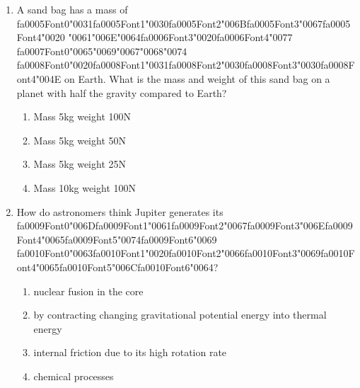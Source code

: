 \documentclass[12pt]{article}
\begin{document}
\begin{enumerate}[label=\arabic*.]
\begin{enumerate}[label=(\alph*)]
    \item Power emitted is 1/16 times as high; peak emission wavelength is 1/2 as long.
    \item Power emitted is 1/4 times as high; peak emission wavelength is 2 times longer.
    \item Power emitted is 1/4 times as high; peak emission wavelength is 1/2 as long.
    \item Power emitted is 1/16 times as high; peak emission wavelength is 2 times longer.
\end{enumerate}
\item A sand bag has a mass of {\csname fa0005Font0\endcsname\char"0031}{\csname fa0005Font1\endcsname\char"0030}{\csname fa0005Font2\endcsname\char"006B}{\csname fa0005Font3\endcsname\char"0067}{\csname fa0005Font4\endcsname\char"0020} {\char"0061}{\char"006E}{\char"0064}{\csname fa0006Font3\endcsname\char"0020}{\csname fa0006Font4\endcsname\char"0077} {\csname fa0007Font0\endcsname\char"0065}{\char"0069}{\char"0067}{\char"0068}{\char"0074} {\csname fa0008Font0\endcsname\char"0020}{\csname fa0008Font1\endcsname\char"0031}{\csname fa0008Font2\endcsname\char"0030}{\csname fa0008Font3\endcsname\char"0030}{\csname fa0008Font4\endcsname\char"004E} on Earth. What is the mass and weight of this
sand bag on a planet with half the gravity compared to Earth?
\begin{enumerate}[label=(\alph*)]
    \item Mass 5kg weight 100N
    \item Mass 5kg weight 50N
    \item Mass 5kg weight 25N
    \item Mass 10kg weight 100N
\end{enumerate}
\item How do astronomers think Jupiter generates its {\csname fa0009Font0\endcsname\char"006D}{\csname fa0009Font1\endcsname\char"0061}{\csname fa0009Font2\endcsname\char"0067}{\csname fa0009Font3\endcsname\char"006E}{\csname fa0009Font4\endcsname\char"0065}{\csname fa0009Font5\endcsname\char"0074}{\csname fa0009Font6\endcsname\char"0069} {\csname fa0010Font0\endcsname\char"0063}{\csname fa0010Font1\endcsname\char"0020}{\csname fa0010Font2\endcsname\char"0066}{\csname fa0010Font3\endcsname\char"0069}{\csname fa0010Font4\endcsname\char"0065}{\csname fa0010Font5\endcsname\char"006C}{\csname fa0010Font6\endcsname\char"0064}?
\begin{enumerate}[label=(\alph*)]
    \item nuclear fusion in the core
    \item by contracting changing gravitational potential energy into thermal energy
    \item internal friction due to its high rotation rate
    \item chemical processes
\end{enumerate}
\end{enumerate}
\end{document}
